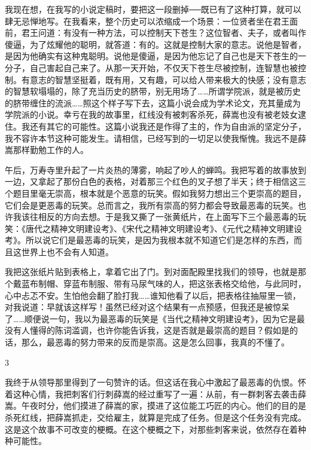 我现在想，在我写的小说定稿时，要把这一段删掉──既已有了这种打算，就可以肆无忌惮地写。在我看来，整个历史可以浓缩成一个场景：一位贤者坐在君王面前，君王问道：有没有一种方法，可以控制天下苍生？这位智者、夫子，或者叫作傻逼，为了炫耀他的聪明，就答道：有的。这就是控制大家的意志。说他是智者，是因为他确实有这种鬼聪明。说他是傻逼，是因为他忘记了自己也是天下苍生的一分子，自己害起自己来了。从那一天开始，不仅天下苍生尽被控制，连智慧也被控制。有意志的智慧坚挺着，既有用，又有趣，可以给人带来极大的快感；没有意志的智慧软塌塌的，除了充当历史的脐带，别无用场了……所谓学院派，就是被历史的脐带缠住的流派……照这个样子写下去，这篇小说会成为学术论文，充其量成为学院派的小说。幸亏在我的故事里，红线没有被刺客杀死，薛嵩也没有被老妓女逮住。我还有其它的可能性。这篇小说我还是作得了主的，作为自由派的坚定分子，我不容许本节这种可能发生。请相信，已经写到的一切足以使我惭愧。我远不是薛嵩那样勤勉工作的人。 

午后，万寿寺里升起了一片炎热的薄雾，响起了吵人的蝉鸣。我把写着的故事放到一边，又拿起了那份白色的表格，对着那三个红色的叉子想了半天；终于相信这三个题目里毫无崇高，根本就是个恶意的玩笑。假如我努力想出三个更崇高的题目，它们会是更恶毒的玩笑。总而言之，我所有崇高的努力都会导致最恶毒的玩笑。也许我该往相反的方向去想。于是我又撕了一张黄纸片，在上面写下三个最恶毒的玩笑：《唐代之精神文明建设考》、《宋代之精神文明建设考》、《元代之精神文明建设考》。所以说它们是最恶毒的玩笑，是因为我根本就不知道它们是怎样的东西，而且这世界上也不会有人知道。 

我把这张纸片贴到表格上，拿着它出了门。到对面配殿里找我们的领导，也就是那个戴蓝布制帽、穿蓝布制服、带有马尿气味的人，把这张表格交给他，与此同时，心中忐忑不安。生怕他会翻了脸打我……谁知他看了以后，把表格往抽屉里一锁，对我说道：早就该这样写！虽然已经对这个结果有一点预感，但我还是被惊呆了……顺便说一句，我以为最恶毒的玩笑是《当代之精神文明建设考》，因为它是最没有人懂得的陈词滥调，也许你能告诉我，这是否就是最崇高的题目？假如是的话，那么，最恶毒的努力带来的反而是崇高。这是怎么回事，我真的不懂了。 

3 

我终于从领导那里得到了一句赞许的话。但这话在我心中激起了最恶毒的仇恨。怀着这种心情，我把刺客们行刺薛嵩的经过重写了一遍：从前，有一群刺客去袭击薛嵩。午夜时分，他们摸进了薛嵩的家，摸进了这位能工巧匠的内心。他们的目的是杀死红线，把薛嵩抓走，交给雇主，就算是完成了任务。但是这个任务没有完成。这是这个故事不可改变的梗概。在这个梗概之下，对那些刺客来说，依然存在着种种可能性。 


